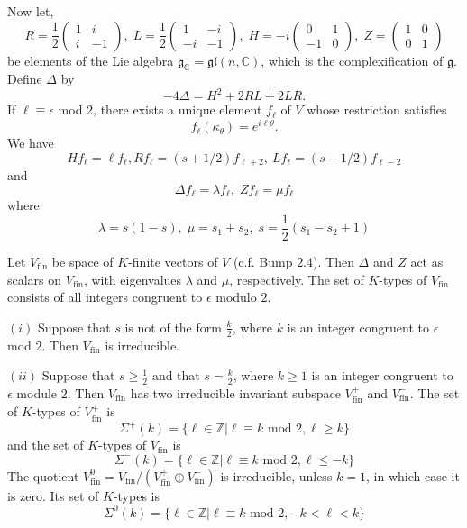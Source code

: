 \documentclass[12pt, letterpaper, twoside]
{article}
\newcommand{\Z}{{\mathbb Z}} %
\newcommand{\C}{{\mathbb C}} %
\newcommand{\gI}{\mathfrak{g}} %
\newcommand{\Gl}{\mathfrak{gl}} %
\begin{document}
Now let,
\[R = \frac{1}{2} \begin{pmatrix} 1 & i \\ i & -1 \end{pmatrix}, \; L =
\frac{1}{2} \begin{pmatrix} 1 & -i \\ -i & -1 \end{pmatrix}, \; H = -i
\begin{pmatrix} 0 & 1 \\ -1 & 0 \end{pmatrix}, \; Z = \begin{pmatrix} 1 & 0 \\ 0
& 1 \end{pmatrix} \] be elements of the Lie algebra $\gI_\C = \Gl(n, \C)$, which
is the complexification of $\gI$. Define $\Delta$ by
\[-4\Delta = H^2 + 2RL + 2LR.\] If $\ell \equiv \epsilon$ mod $2$, there exists
a unique element $f_\ell$ of $V$ whose restriction satisfies
\[f_\ell(\kappa_\theta) = e^{i\ell \theta}.\] We have
\[H f_\ell = \ell f_\ell, R f_\ell = (s + 1/2) f_{\ell + 2}, \ Lf_{\ell} = (s -
1/2) f_{\ell - 2}\] and
\[\Delta f_\ell = \lambda f_\ell, \; Z f_\ell = \mu f_\ell\] where
\[\lambda = s(1 - s), \; \mu = s_1 + s_2, \; s = \frac{1}{2}(s_1 - s_2 + 1)\]

Let $V_{\text{fin}}$ be space of $K$-finite vectors of $V$ (c.f. Bump $2.4$).
Then $\Delta$ and $Z$ act as scalars on $V_{\text{fin}}$, with eigenvalues
$\lambda$ and $\mu$, respectively. The set of $K$-types of $V_{\text{fin}}$
consists of all integers congruent to $\epsilon$ modulo $2$. 

$(i)$ Suppose that $s$ is not of the form $\frac{k}{2}$, where $k$ is an integer
congruent to $\epsilon$ mod $2$. Then $V_{\text{fin}}$ is irreducible. 

$(ii)$ Suppose that $s \geq \frac{1}{2}$ and that $s = \frac{k}{2}$, where $k
\geq 1$ is an integer congruent to $\epsilon$ module $2$. Then $V_{\text{fin}}$
has two irreducible invariant subspace $V_{\text{fin}}^+$ and
$V_{\text{fin}}^-$. The set of $K$-types of $V_{\text{fin}}^+$ is
\[\Sigma^+(k) = \{ \ell \in \Z | \ell \equiv k \text{ mod } 2, \ell \geq k\}\]
and the set of $K$-types of $V_{\text{fin}}^-$ is
\[\Sigma^-(k) = \{ \ell \in \Z | \ell \equiv k \text{ mod } 2, \ell \leq -k\}\]
The quotient $V_{\text{fin}}^0 = V_{\text{fin}} / (V_{\text{fin}}^+ \oplus
V_{\text{fin}}^-)$ is irreducible, unless $k = 1$, in which case it is zero. Its
set of $K$-types is
\[\Sigma^0(k) = \{ \ell \in \Z | \ell \equiv k \text{ mod } 2, -k < \ell < k\}\]
\end{document}
